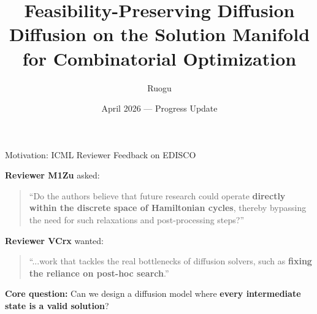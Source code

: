 \documentclass[aspectratio=169,12pt]{beamer}
\title{\textbf{Feasibility-Preserving Diffusion} \\[0.3em]
\large Diffusion on the Solution Manifold for Combinatorial Optimization}
\author{Ruogu}
\date{April 2026 — Progress Update}
\begin{document}
\begin{frame}
\titlepage
\end{frame}

\begin{frame}{Motivation: ICML Reviewer Feedback on EDISCO}

\textbf{Reviewer M1Zu} asked:
\begin{quote}
``Do the authors believe that future research could operate \textbf{directly within the discrete space of Hamiltonian cycles}, thereby bypassing the need for such relaxations and post-processing steps?''
\end{quote}

\vspace{0.5em}
\textbf{Reviewer VCrx} wanted:
\begin{quote}
``...work that tackles the real bottlenecks of diffusion solvers, such as \textbf{fixing the reliance on post-hoc search}.''
\end{quote}

\vspace{0.8em}
\textbf{Core question:} Can we design a diffusion model where \textbf{every intermediate state is a valid solution}?

\end{frame}
\end{document}
